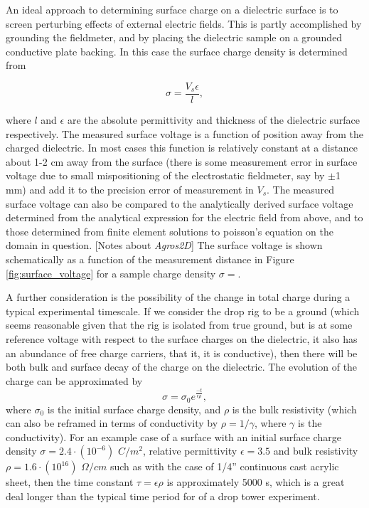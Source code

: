 \documentclass[a4paper, 12pt]{article}
\begin{document}
An ideal approach to determining surface charge on a dielectric surface is to screen perturbing effects of external electric fields. This is partly accomplished by grounding the fieldmeter, and by placing the dielectric sample on a grounded conductive plate backing. In this case the surface charge density is determined from

\[ \sigma = \frac{V_s \epsilon}{l}, \]

where $l$ and $\epsilon$ are the absolute permittivity and thickness of the dielectric surface respectively. The measured surface voltage is a function of position away from the charged dielectric. In most cases this function is relatively constant at a distance about 1-2 cm away from the surface (there is some measurement error in surface voltage due to small mispositioning of the electrostatic fieldmeter, say by $\pm$1 mm) and add it to the precision error of measurement in $V_s$. The measured surface voltage can also be compared to the analytically derived surface voltage determined from the analytical expression for the electric field from above, and to those determined from finite element solutions to poisson's equation on the domain in question. [Notes about \emph{Agros2D}] The surface voltage is shown schematically as a function of the measurement distance in Figure \ref{fig:surface_voltage} for a sample charge density $\sigma = $.


A further consideration is the possibility of the change in total charge during a typical experimental timescale. If we consider the drop rig to be a ground (which seems reasonable given that the rig is isolated from true ground, but is at some reference voltage with respect to the surface charges on the dielectric, it also has an abundance of free charge carriers, that it, it is conductive), then there will be both bulk and surface decay of the charge on the dielectric. The evolution of the charge can be approximated by
\[ \sigma = \sigma_0 e^{\frac{-t}{\epsilon \rho}}, \]
where $\sigma_0$ is the initial surface charge density, and $\rho$ is the bulk resistivity (which can also be reframed in terms of conductivity by $\rho = 1/\gamma$, where $\gamma$ is the conductivity). For an example case of a surface with an initial surface charge density $\sigma = 2.4 \cdot (10^{-6})$ $C/m^2$, relative permittivity $\epsilon = 3.5$ and bulk resistivity $\rho = 1.6 \cdot (10^{16})$ $\Omega/cm$ such as with the case of 1/4'' continuous cast acrylic sheet, then the time constant $\tau = \epsilon \rho$ is approximately 5000 s, which is a great deal longer than the typical time period for of a drop tower experiment.
\end{document}
